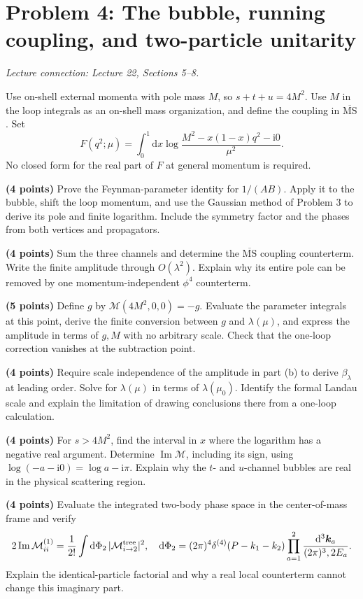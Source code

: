 \documentclass[11pt]{article}
\newcommand{\dd}{\mathrm d}
\newcommand{\ii}{\mathrm i}
\newcommand{\MSbar}{\overline{\mathrm{MS}}}
\newcommand{\problem}[2]{\clearpage\section*{\color{qftblue}Problem #1: #2}}
\newcommand{\connection}[1]{{\small\textit{Lecture connection: #1}\par}\medskip}
\begin{document}
\problem{4}{The bubble, running coupling, and two-particle unitarity}
\connection{Lecture 22, Sections 5--8.}
Use on-shell external momenta with pole mass \(M\), so
\(s+t+u=4M^2\). Use \(M\) in the loop integrals as an on-shell mass
organization, and define the coupling in \(\MSbar\). Set
\[
 F(q^2;\mu)=\int_0^1\dd x\log\frac{M^2-x(1-x)q^2-\ii0}{\mu^2}.
\]
No closed form for the real part of \(F\) at general momentum is required.
\begin{parts}
\item \textbf{(4 points)} Prove the Feynman-parameter identity for
\(1/(AB)\). Apply it to the bubble, shift the loop momentum, and use
the Gaussian method of Problem 3 to derive its pole and finite
logarithm. Include the symmetry factor and the phases from both
vertices and propagators.

\item \textbf{(4 points)} Sum the three channels and determine the
\(\MSbar\) coupling counterterm. Write the finite amplitude through
\(O(\lambda^2)\). Explain why its entire pole can be removed by one
momentum-independent \(\phi^4\) counterterm.

\item \textbf{(5 points)} Define \(g\) by
\(\mathcal M(4M^2,0,0)=-g\). Evaluate the parameter integrals at this
point, derive the finite conversion between \(g\) and \(\lambda(\mu)\),
and express the amplitude in terms of \(g,M\) with no arbitrary scale.
Check that the one-loop correction vanishes at the subtraction point.

\item \textbf{(4 points)} Require scale independence of the amplitude
in part (b) to derive \(\beta_\lambda\) at leading order. Solve for
\(\lambda(\mu)\) in terms of \(\lambda(\mu_0)\). Identify the formal
Landau scale and explain the limitation of drawing conclusions there
from a one-loop calculation.

\item \textbf{(4 points)} For \(s>4M^2\), find the interval in \(x\)
where the logarithm has a negative real argument. Determine
\(\operatorname{Im}\mathcal M\), including its sign, using
\(\log(-a-\ii0)=\log a-\ii\pi\). Explain why the \(t\)- and
\(u\)-channel bubbles are real in the physical scattering region.

\item \textbf{(4 points)} Evaluate the integrated two-body phase space
in the center-of-mass frame and verify
\[
 2\operatorname{Im}\mathcal M_{ii}^{(1)}
 =\frac1{2!}\int\dd\Phi_2\,|\mathcal M_{i\to2}^{\rm tree}|^2,
 \quad
 \dd\Phi_2=(2\pi)^4\delta^{(4)}(P-k_1-k_2)
 \prod_{a=1}^2\frac{\dd^3\bm k_a}{(2\pi)^3,2E_a}.
\]
Explain the identical-particle factorial and why a real local
counterterm cannot change this imaginary part.
\end{parts}
\end{document}
